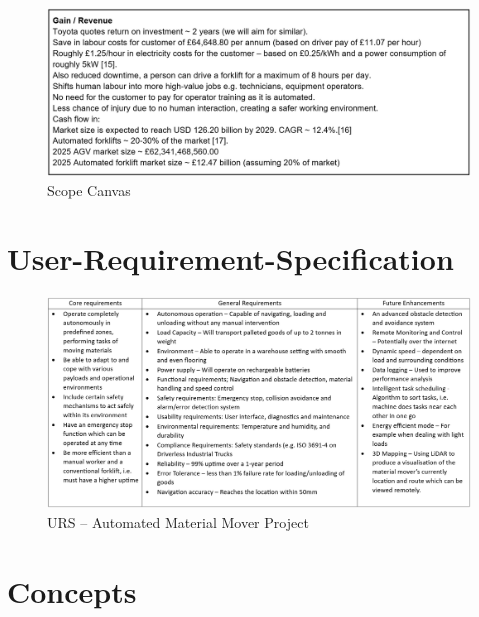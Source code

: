 \documentclass[12pt,titlepage]{article}
\begin{document}
 \vspace{-3em}
\begin{figure}[H]
     \centering
    \includegraphics[width=1\linewidth]{Scope Canvas 4.png}
    \vspace{-30pt}
    \caption{Scope Canvas}
     \label{fig:Scope Canvas}
\end{figure}
\FloatBarrier
\vspace{-20pt}
\section{User-Requirement-Specification}
\vspace{-20pt}
\begin{figure}[htbp]
    \centering
    \includegraphics[width=1\textwidth]{URS1.png}
    \vspace{-20pt}
    \caption{URS – Automated Material Mover Project}
    \label{fig:URS}
\end{figure}

\FloatBarrier

\vspace{-20pt}


\section{Concepts}
\end{document}
